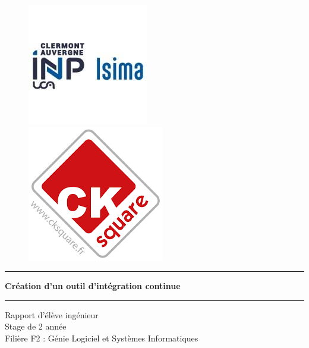 \begin{titlepage}
  \hspace{\fill}
  \begin{figure}[!htb]
     \begin{minipage}{0.50\textwidth}
       \centering
       \includegraphics[scale=0.8]{./img/logo_isima_inp.jpeg}
     \end{minipage}\hfill
     \begin{minipage}{0.50\textwidth}
       \centering
       \includegraphics[scale=0.4]{./img/logo-ck.png}%
     \end{minipage}
  \end{figure}
  \begin{center}
    \vspace*{1cm}

    \par\noindent\rule{\textwidth}{0.5pt}
    \Huge
    \textbf{Création d'un outil d'intégration continue}
    \par\noindent\rule{\textwidth}{0.5pt}

    \vspace{0.2cm}
    \LARGE
    Rapport d'élève ingénieur\\
    Stage de 2 année\\
    Filière F2 : Génie Logiciel et Systèmes Informatiques

    \vspace{1.5cm}


\end{center}
\end{titlepage}
